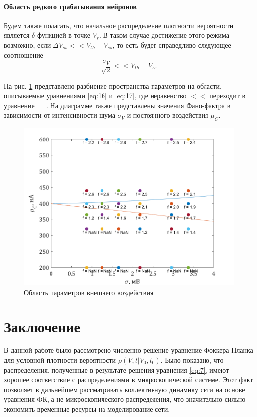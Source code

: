 \paragraph{Область редкого срабатывания нейронов}
Будем также полагать, что начальное распределение плотности вероятности является $\delta$-функцией в точке $V_r$. В таком случае достижение этого режима возможно, если $\Delta V_{ss}<<V_{th}-V_{ss}$, то есть будет справедливо следующее соотношение 
\begin{equation}
\frac{\sigma_V}{\sqrt{2}}<<V_{th}-V_{ss}
\label{eq:17}
\end{equation}

На рис. \ref{pic:6} представлено разбиение пространства параметров на области, описываемые уравнениями \eqref{eq:16} и \eqref{eq:17}, где  неравенство $<<$ переходит в уравнение $=$. На диаграмме также представлены значения Фано-фактра в зависимости от интенсивности шума $\sigma_V$ и постоянного воздействия $\mu_C$.
\begin{figure}[H]
	\centering
	\includegraphics[width=0.8\linewidth]{pic/T_mean_T_sigma3.png}
	\caption{Область параметров внешнего воздействия}
	\label{pic:6}
\end{figure}
\section*{Заключение}
В данной работе было рассмотрено численно решение уравнение Фоккера-Планка для условной плотности вероятности $\rho(V, t|V_0, t_0)$. Было показано, что распределения, полученные в результате решения уравнения \eqref{eq:7}, имеют хорошее соответствие с распределениями в микроскопической системе. Этот факт позволяет в дальнейшем рассматривать коллективную динамику сети на основе уравнения ФК, а не микроскопического распределения, что значительно сильно экономить временные ресурсы на моделирование сети.
